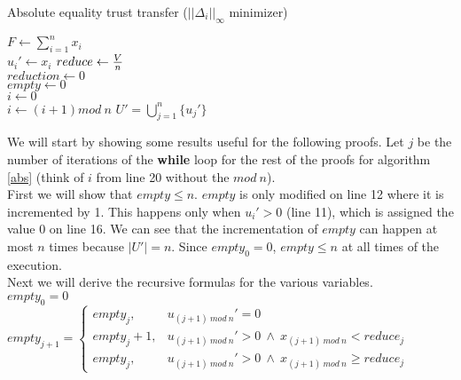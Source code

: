 \documentclass[11pt]{article}
\theoremstyle{definition}
\theoremstyle{corollary}
\begin{document}
    \begin{algorithm}[H]
       \label{abs}
       \caption{Absolute equality trust transfer ($||\Delta_i||_\infty$ minimizer)}
       $F \gets \sum\limits_{i=1}^{n}x_i$ \\
          {$u_i' \gets x_i$}
       $reduce \gets {V \over n}$ \\
       $reduction \gets 0$ \\
       $empty \gets 0$ \\
       $i \gets 0$ \\
          {
           $i \gets (i + 1) mod \:n$}
       \Return $U' = \bigcup\limits_{j=1}^{n}\{u_j'\}$
    \end{algorithm}
       \noindent
       We will start by showing some results useful for the following proofs. Let $j$ be the number of iterations of the
       \textbf{while} loop for the rest of the proofs for algorithm \ref{abs} (think of $i$ from line 20 without the
       $mod\:n$).\\
       First we will show that $empty \leq n$. $empty$ is only modified on line 12 where it is incremented by 1. This
       happens only when $u_i' > 0$ (line 11), which is assigned the value 0 on line 16. We can see that the
       incrementation of $empty$ can happen at most $n$ times because $|U'| = n$. Since $empty_0 = 0$, $empty \leq n$
       at all times of the execution. \\
       Next we will derive the recursive formulas for the various variables. \\
       $empty_0 = 0$ \\
       $empty_{j+1} = 
          \begin{cases}
             empty_j, & u_{(j+1)\:mod\:n}' = 0 \\
             empty_j+1, & u_{(j+1)\:mod\:n}' > 0 \: \wedge \: x_{(j+1) \:mod\:n} < reduce_j \\
             empty_j, & u_{(j+1)\:mod\:n}' > 0 \: \wedge \: x_{(j+1) \:mod\:n} \geq reduce_j
          \end{cases}$ \\ \ \\
\end{document}
